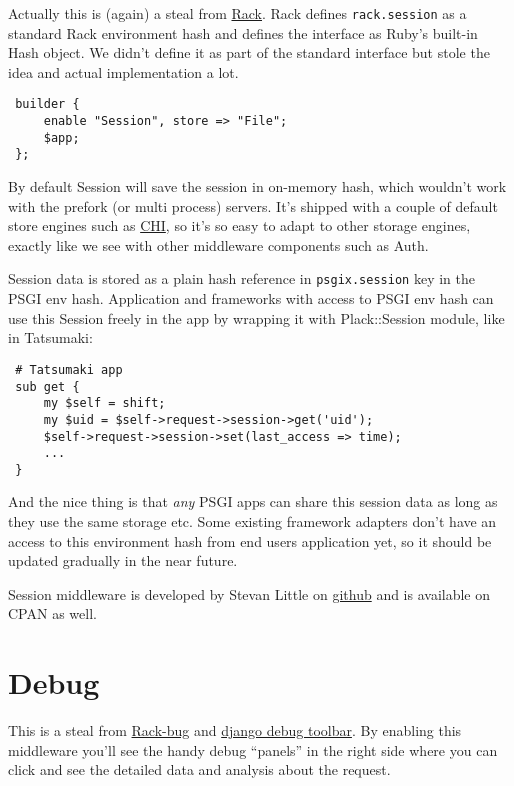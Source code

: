 Actually this is (again) a steal from
\href{http://rack.rubyforge.org/}{Rack}. Rack defines
\lstinline!rack.session! as a standard Rack environment hash and defines
the interface as Ruby's built-in Hash object. We didn't define it as
part of the standard interface but stole the idea and actual
implementation a lot.

\begin{lstlisting}
 builder {
     enable "Session", store => "File";
     $app;
 };
\end{lstlisting}

By default Session will save the session in on-memory hash, which
wouldn't work with the prefork (or multi process) servers. It's shipped
with a couple of default store engines such as
\href{http://search.cpan.org/perldoc?CHI}{CHI}, so it's so easy to adapt
to other storage engines, exactly like we see with other middleware
components such as Auth.

Session data is stored as a plain hash reference in
\lstinline!psgix.session! key in the PSGI env hash. Application and
frameworks with access to PSGI env hash can use this Session freely in
the app by wrapping it with Plack::Session module, like in Tatsumaki:

\begin{lstlisting}
 # Tatsumaki app
 sub get {
     my $self = shift;
     my $uid = $self->request->session->get('uid');
     $self->request->session->set(last_access => time);
     ...
 }
\end{lstlisting}

And the nice thing is that \emph{any} PSGI apps can share this session
data as long as they use the same storage etc. Some existing framework
adapters don't have an access to this environment hash from end users
application yet, so it should be updated gradually in the near future.

Session middleware is developed by Stevan Little on
\href{http://github.com/stevan/plack-middleware-session}{github} and is
available on CPAN as well.

\section{Debug}\label{debug}

This is a steal from \href{http://github.com/brynary/rack-bug}{Rack-bug}
and \href{http://github.com/robhudson/django-debug-toolbar}{django debug
toolbar}. By enabling this middleware you'll see the handy debug
``panels'' in the right side where you can click and see the detailed
data and analysis about the request.

